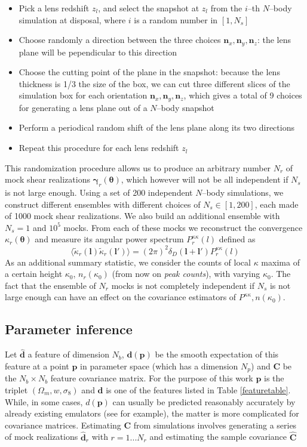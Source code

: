 \documentclass[reprint,aps,prd,superscriptaddress,showkeys,showpacs]{revtex4-1}
\newcommand{\bb}[1]{\mathbf{#1}}
\newcommand{\bbh}[1]{\mathbf{\hat{#1}}}
\begin{document}
\begin{itemize}
\item Pick a lens redshift $z_l$, and select the snapshot at $z_l$ from the $i$--th $N$--body simulation at disposal, where $i$ is a random number in $[1,N_s]$
\item Choose randomly a direction between the three choices ${\bb{n}_x,\bb{n}_y,\bb{n}_z}$: the lens plane will be pependicular to this direction
\item Choose the cutting point of the plane in the snapshot: because the lens thickness is 1/3 the size of the box, we can cut three different slices of the simulation box for each orientation ${\bb{n}_x,\bb{n}_y,\bb{n}_z}$, which gives a total of 9 choices for generating a lens plane out of a $N$--body snapshot
\item Perform a periodical random shift of the lens plane along its two directions
\item Repeat this procedure for each lens redshift $z_l$  
\end{itemize}  
%
This randomization procedure allows us to produce an arbitrary number $N_r$ of mock shear realizations $\pmb{\gamma}_r(\pmb{\theta})$, which however will not be all independent if $N_s$ is not large enough. Using a set of 200 independent $N$--body simulations, we construct different ensembles with different choices of $N_s\in[1,200]$, each made of 1000 mock shear realizations. We also build an additional ensemble with $N_s=1$ and $10^5$ mocks. From each of these mocks we reconstruct the convergence $\kappa_r(\pmb{\theta})$ and measure its angular power spectrum $P^{\kappa\kappa}_r(l)$ defined as
\begin{equation}
\langle\tilde{\kappa}_r(\bb{l})\tilde{\kappa}_r(\bb{l}')\rangle = (2\pi)^2\delta_D(\bb{l}+\bb{l}')P^{\kappa\kappa}_r(l)
\end{equation}
%
As an additional summary statistic, we consider the counts of local $\kappa$ maxima of a certain height $\kappa_0$, $n_r(\kappa_0)$ (from now on \textit{peak counts}), with varying $\kappa_0$. The fact that the ensemble of $N_r$ mocks is not completely independent if $N_s$ is not large enough can have an effect on the covariance estimators of $P^{\kappa\kappa},n(\kappa_0)$. 


\subsection{Parameter inference}
%
Let $\bbh{d}$ a feature of dimension $N_b$, $\bb{d}(\bb{p})$ be the smooth expectation of this feature at a point $\bb{p}$ in parameter space (which has a dimension $N_p$) and $\bb{C}$ be the $N_b\times N_b$ feature covariance matrix. For the purpose of this work $\bb{p}$ is the triplet $(\Omega_m,w,\sigma_8)$ and $\bb{d}$ is one of the features listed in Table \ref{featuretable}. While, in some cases, $d(\bb{p})$ can usually be predicted reasonably accurately by already existing emulators (see \citep{coyote2,Nicaea} for example), the matter is more complicated for covariance matrices. Estimating $\bb{C}$ from simulations involves generating a series of mock realizations $\bbh{d}_r$ with $r=1...N_r$ and estimating the sample covariance $\bbh{C}$
\end{document}
